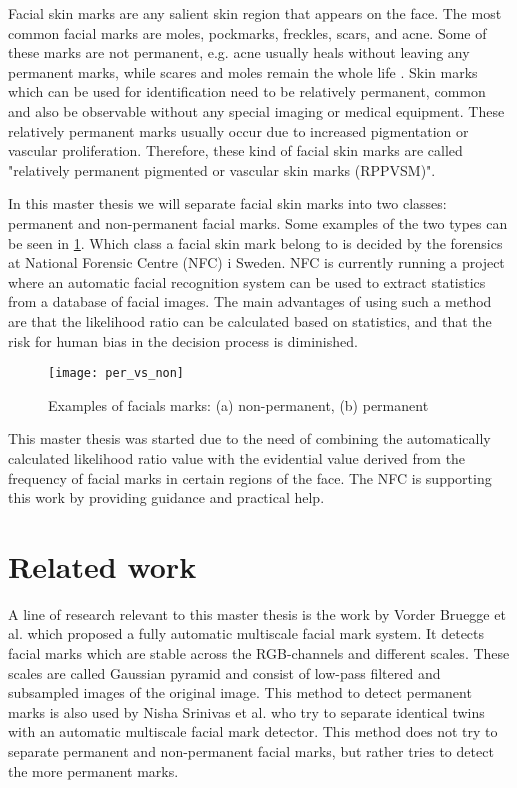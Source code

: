 Facial skin marks are any salient skin region that appears on the face. The most common facial marks are moles, pockmarks, freckles, scars, and acne. Some of these marks are not permanent, e.g. acne usually heals without leaving any permanent marks, while scares and moles remain the whole life \cite{automatic_detector_2015}. Skin marks which can be used for identification need to be relatively permanent, common and also be observable without any special imaging or medical equipment. These relatively permanent marks usually occur due to increased pigmentation or vascular proliferation. Therefore, these kind of facial skin marks are called "relatively permanent pigmented or vascular skin marks (RPPVSM)". \cite{statistic_RPPVSM} 

In this master thesis we will separate facial skin marks into two classes: permanent and non-permanent facial marks. Some examples of the two types can be seen in \cref{fig:per_vs_non}. Which class a facial skin mark belong to is decided by the forensics at National Forensic Centre (NFC) i Sweden. NFC is currently running a project where an automatic facial recognition system can be used to extract statistics from a database of facial images. The main advantages of using such a method are that the likelihood ratio can be calculated based on statistics, and that the risk for human bias in the decision process is diminished.

\FloatBarrier
\begin{figure}[h]
	\centering
	\texttt{[image: per\_vs\_non]}
	\caption{Examples of facials marks: (a) non-permanent, (b) permanent \label{fig:per_vs_non}}
\end{figure}
\FloatBarrier

This master thesis was started due to the need of combining the automatically calculated likelihood ratio value with the evidential value derived from the frequency of facial marks in certain regions of the face. The NFC is supporting this work by providing guidance and practical help.

\section{Related work}

A line of research relevant to this master thesis is the work by Vorder Bruegge et al. \cite{automatic_detector_2015} which proposed a fully automatic multiscale facial mark system. It detects facial marks which are stable across the RGB-channels and different scales. These scales are called Gaussian pyramid and consist of low-pass filtered and subsampled images of the original image. This method to detect permanent marks is also used by Nisha Srinivas et al. \cite{twins} who try to separate identical twins with an automatic multiscale facial mark detector. This method does not try to separate permanent and non-permanent facial marks, but rather tries to detect the more permanent marks.  

